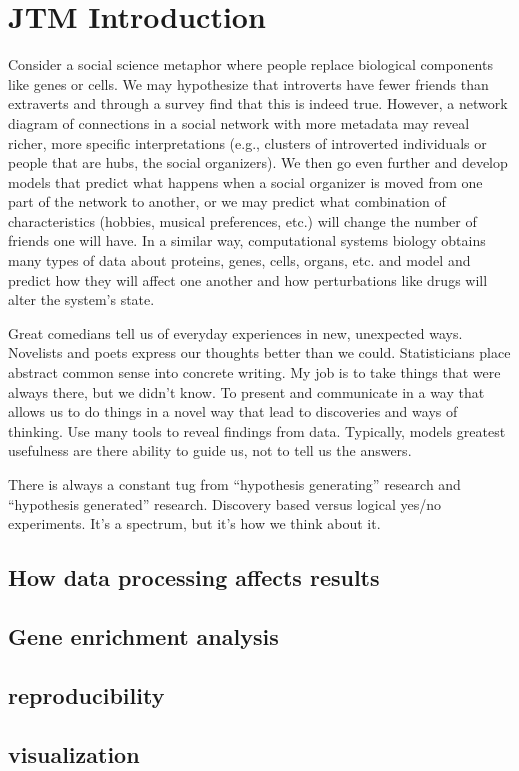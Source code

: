 
\chapter{JTM Introduction}\label{chapter:intro3}






Consider a social science metaphor where people replace biological 
components like genes or cells. We may hypothesize that 
introverts have fewer friends than extraverts and through 
a survey find that this is indeed true. However, a network 
diagram of connections in a social network with more metadata 
may reveal richer, more specific interpretations (e.g., 
clusters of introverted individuals or people that are 
hubs, the social organizers). We then go even further 
and develop models that predict what happens when a 
social organizer is moved from one part of the network to 
another, or we may predict what combination of characteristics 
(hobbies, musical preferences, etc.) will change the number 
of friends one will have. In a similar way, computational 
systems biology obtains many types of data about proteins, 
genes, cells, organs, etc. and model and predict how they 
will affect one another and how perturbations like drugs 
will alter the system’s state.




Great comedians tell us of everyday experiences in new, 
unexpected ways. Novelists and poets express our thoughts 
better than we could. Statisticians place abstract common 
sense into concrete writing. My job is to take things that 
were always there, but we didn’t know. To present and 
communicate in a way that allows us to do things in a 
novel way that lead to discoveries and ways of thinking.  
Use many tools to reveal findings from data. Typically, 
models greatest usefulness are there ability to guide us, 
not to tell us the answers.


There is always a constant tug from “hypothesis generating” 
research and “hypothesis generated” research. Discovery 
based versus logical yes/no experiments. It’s a spectrum, 
but it’s how we think about it.





\section{How data processing affects results}

\section{Gene enrichment analysis}

\section{reproducibility}

\section{visualization}